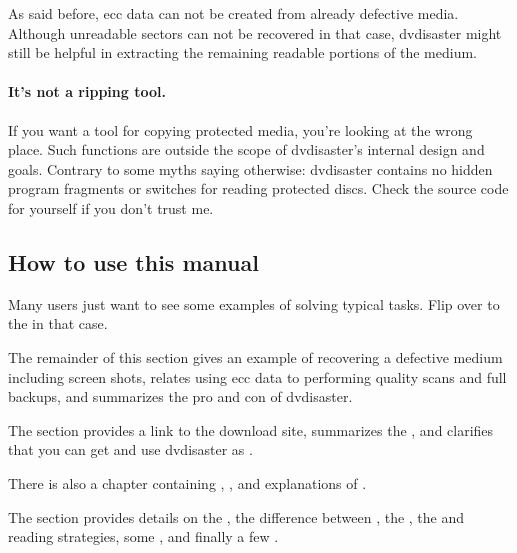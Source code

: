 As said before, ecc data can not be created from already defective media.
Although unreadable sectors can not be recovered in that case, dvdisaster
might still be helpful in extracting the remaining readable portions of the medium. 

\paragraph{It's not a ripping tool.} If you want a tool for copying
protected media, you're looking at the wrong place. Such functions are
outside the scope of dvdisaster's internal design and goals.
Contrary to some myths saying otherwise: dvdisaster contains 
no hidden program fragments or switches for reading protected discs.
Check the source code for yourself if you don't trust me.

 
\subsection{How to use this manual}

Many users just want to see some examples of solving typical tasks. Flip over
to the  in that case. 

\smallskip

The remainder of this section gives an example of recovering a defective medium including
screen shots, relates using ecc data to performing quality scans and full backups,
and summarizes the pro and con of dvdisaster.

\smallskip

The  section provides a link to the download site,
summarizes the ,
and clarifies that you can get and use dvdisaster as
.

\smallskip

There is also a chapter containing ,
, 
and explanations of .

\smallskip

The  section provides details on
the ,
the difference between ,
the ,
the 
and  reading strategies,
some ,
and finally a few .

